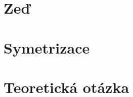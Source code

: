 \documentclass{article}
\begin{document}
\maketitle
\tableofcontents
\newpage



\section{Zeď}



\section{Symetrizace}



\section{Teoretická otázka}
\end{document}
